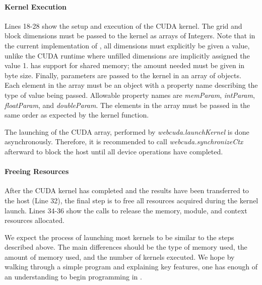 \paragraph{Kernel Execution}
Lines 18-28 show the setup and execution of the CUDA kernel. The grid and block dimensions must
be passed to the kernel as arrays of Integers. Note that in the current
implementation of \namens, all dimensions must explicitly be given a value,
unlike the CUDA runtime where unfilled dimensions are implicitly assigned the
value 1. \name has support for shared memory; the amount needed must be
given in byte size. Finally, parameters are passed to the kernel in an
array of objects. Each element in the array must be an object with a property
name describing the type of value being passed. Allowable property names are
\textit{memParam}, \textit{intParam}, \textit{floatParam}, and
\textit{doubleParam}. The elements in the
array must be passed in the same order as expected by the kernel function.

The launching of the CUDA array, performed by \textit{webcuda.launchKernel} is
done asynchronously. Therefore, it is recommended to call
\textit{webcuda.synchronizeCtx} afterward to block the host until all device operations
have completed.

\paragraph{Freeing Resources}
After the CUDA kernel has completed and the results have been transferred to the
host (Line 32), the final step is to free all resources acquired during the
kernel launch. Lines 34-36 show the \name calls to release the memory, module,
and context resources allocated.


We expect the process of launching most kernels to be similar to the steps
described above.  The main differences should be the type of memory used, the
amount of memory used, and the number of kernels executed. We hope by walking
through a simple program and explaining key \name features, one has enough of an
understanding to begin programming in \namens.

